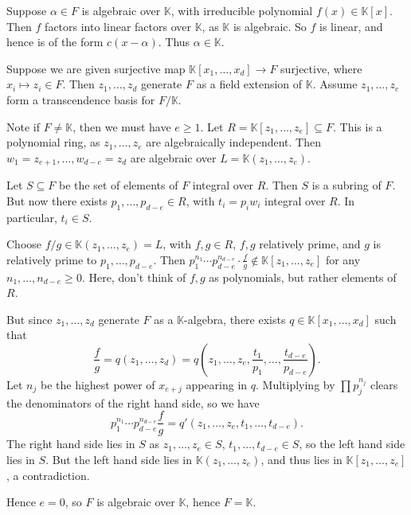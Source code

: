 \documentclass[12pt]{article}
\begin{document}
\begin{proofbox}
	Suppose $\alpha \in F$ is algebraic over $\mathbb{K}$, with irreducible polynomial $f(x) \in \mathbb{K}[x]$. Then $f$ factors into linear factors over $\mathbb{K}$, as $\mathbb{K}$ is algebraic. So $f$ is linear, and hence is of the form $c(x - \alpha)$. Thus $\alpha \in \mathbb{K}$.

	Suppose we are given surjective map $\mathbb{K}[x_1, \ldots, x_d] \to F$ surjective, where $x_i \mapsto z_i \in F$. Then $z_1, \ldots, z_d$ generate $F$ as a field extension of $\mathbb{K}$. Assume $z_1, \ldots, z_e$ form a transcendence basis for $F / \mathbb{K}$.

	Note if $F \neq \mathbb{K}$, then we must have $e \geq 1$. Let $R = \mathbb{K}[z_1, \ldots, z_e] \subseteq F$. This is a polynomial ring, as $z_1, \ldots, z_e$ are algebraically independent. Then $w_1 = z_{e+1}, \ldots, w_{d-e} = z_d$ are algebraic over $L = \mathbb{K}(z_1, \ldots, z_e)$.

	Let $S \subseteq F$ be the set of elements of $F$ integral over $R$. Then $S$ is a subring of $F$. But now there exists $p_1, \ldots, p_{d-e} \in R$, with $t_i = p_i w_i$ integral over $R$. In particular, $t_i \in S$.

	Choose $f/g \in \mathbb{K}(z_1, \ldots, z_e) = L$, with $f, g \in R$, $f, g$ relatively prime, and $g$ is relatively prime to $p_1, \ldots, p_{d-e}$. Then $p_1^{n_1} \cdots p_{d-e}^{n_{d-e}} \cdot \frac{f}{g} \not \in \mathbb{K}[z_1, \ldots, z_e]$ for any $n_1, \ldots, n_{d - e} \geq 0$. Here, don't think of $f, g$ as polynomials, but rather elements of $R$.

	But since $z_1, \ldots, z_d$ generate $F$ as a $\mathbb{K}$-algebra, there exists $q \in \mathbb{K}[x_1, \ldots, x_d]$ such that
	\[
	\frac{f}{g} = q(z_1, \ldots, z_d) = q\left(z_1, \ldots, z_e, \frac{t_1}{p_1}, \ldots, \frac{t_{d-e}}{p_{d-e}} \right).
	\]
	Let $n_j$ be the highest power of $x_{e+j}$ appearing in $q$. Multiplying by $\prod p_j^{n_j}$ clears the denominators of the right hand side, so we have
	\[
	p_1^{n_1} \cdots p_{d-e}^{n_{d-e}} \frac{f}{g} = q'(z_1, \ldots, z_e, t_1, \ldots, t_{d-e}).
	\]
	The right hand side lies in $S$ as $z_1, \ldots, z_e \in S$, $t_1, \ldots, t_{d-e} \in S$, so the left hand side lies in $S$. But the left hand side lies in $\mathbb{K}(z_1, \ldots, z_e)$, and thus lies in $\mathbb{K}[z_1, \ldots, z_e]$, a contradiction.

	Hence $e = 0$, so $F$ is algebraic over $\mathbb{K}$, hence $F = \mathbb{K}$.
\end{proofbox}
\end{document}
